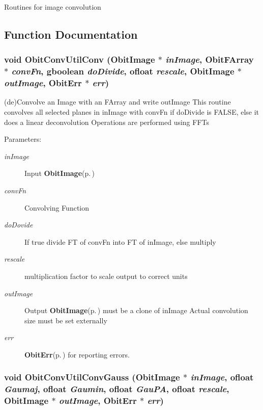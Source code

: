 Routines for image convolution

\subsection{Function Documentation}
\subsubsection{\setlength{\rightskip}{0pt plus 5cm}void Obit\-Conv\-Util\-Conv ({\bf Obit\-Image} $\ast$ {\em in\-Image}, {\bf Obit\-FArray} $\ast$ {\em conv\-Fn}, gboolean {\em do\-Divide}, {\bf ofloat} {\em rescale}, {\bf Obit\-Image} $\ast$ {\em out\-Image}, {\bf Obit\-Err} $\ast$ {\em err})}\label{ObitConvUtil_8c_a0}


(de)Convolve an Image with an FArray and write out\-Image This routine convolves all selected planes in in\-Image with conv\-Fn if do\-Divide is FALSE, else it does a linear deconvolution Operations are performed using FFTs 

\begin{Desc}
\item[Parameters:]
\begin{description}
\item[{\em in\-Image}]Input {\bf Obit\-Image}{\rm (p.\,\pageref{structObitImage})} \item[{\em conv\-Fn}]Convolving Function \item[{\em do\-Dovide}]If true divide FT of conv\-Fn into FT of in\-Image, else multiply \item[{\em rescale}]multiplication factor to scale output to correct units \item[{\em out\-Image}]Output {\bf Obit\-Image}{\rm (p.\,\pageref{structObitImage})} must be a clone of in\-Image Actual convolution size must be set externally \item[{\em err}]{\bf Obit\-Err}{\rm (p.\,\pageref{structObitErr})} for reporting errors. \end{description}
\end{Desc}
\subsubsection{\setlength{\rightskip}{0pt plus 5cm}void Obit\-Conv\-Util\-Conv\-Gauss ({\bf Obit\-Image} $\ast$ {\em in\-Image}, {\bf ofloat} {\em Gaumaj}, {\bf ofloat} {\em Gaumin}, {\bf ofloat} {\em Gau\-PA}, {\bf ofloat} {\em rescale}, {\bf Obit\-Image} $\ast$ {\em out\-Image}, {\bf Obit\-Err} $\ast$ {\em err})}\label{ObitConvUtil_8c_a1}


